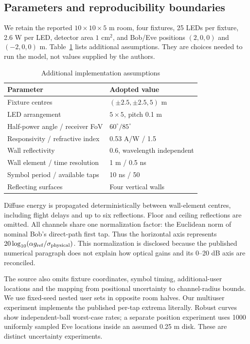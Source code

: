 \documentclass[conference]{IEEEtran}
\begin{document}
\subsection{Parameters and reproducibility boundaries}
We retain the reported $10\times10\times5$ m room, four fixtures, 25 LEDs per fixture, 2.6 W per LED, detector area $1$ cm$^2$, and Bob/Eve positions $(2,0,0)$ and $(-2,0,0)$ m. Table~\ref{tab:params} lists additional assumptions. They are choices needed to run the model, not values supplied by the authors.
\begin{table}[t]
\caption{Additional implementation assumptions}\label{tab:params}
\centering\begin{tabular}{ll}\toprule
Parameter & Adopted value\\\midrule
Fixture centres & $(\pm2.5,\pm2.5,5)$ m\\
LED arrangement & $5\times5$, pitch 0.1 m\\
Half-power angle / receiver FoV & $60^\circ /85^\circ$\\
Responsivity / refractive index & 0.53 A/W / 1.5\\
Wall reflectivity & 0.6, wavelength independent\\
Wall element / time resolution & 1 m / 0.5 ns\\
Symbol period / available taps & 10 ns / 50\\
Reflecting surfaces & Four vertical walls\\\bottomrule
\end{tabular}
\end{table}

Diffuse energy is propagated deterministically between wall-element centres, including flight delays and up to six reflections. Floor and ceiling reflections are omitted. All channels share one normalization factor: the Euclidean norm of nominal Bob's direct-path first tap. Thus the horizontal axis represents $20\log_{10}(\alpha g_{\rm ref}/\sigma_{\rm physical})$. This normalization is disclosed because the published numerical paragraph does not explain how optical gains and its 0--20 dB axis are reconciled.

The source also omits fixture coordinates, symbol timing, additional-user locations and the mapping from positional uncertainty to channel-radius bounds. We use fixed-seed nested user sets in opposite room halves. Our multiuser experiment implements the published per-tap extrema literally. Robust curves show independent-ball worst-case rates; a separate position experiment uses 1000 uniformly sampled Eve locations inside an assumed 0.25 m disk. These are distinct uncertainty experiments.
\end{document}
